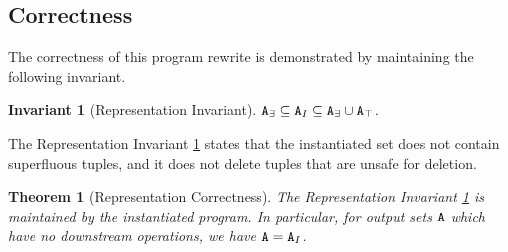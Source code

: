 \documentclass[10pt]{proc}
\numberwithin{equation}{section}
\newtheorem{thm}[theorem]{Theorem}
\newtheorem{invariant}[property]{Invariant}
\renewcommand{\tt}[1]{\ifmmode\text{\texttt{#1}}\else\texttt{#1}\fi}
\begin{document}
\subsection{Correctness}
The correctness of this program rewrite is demonstrated by maintaining the following invariant.
\begin{invariant}[Representation Invariant]\label{inv:representation}
$\tt{A}_\exists \subseteq \tt{A}_I \subseteq \tt{A}_\exists \cup \tt{A}_\top$.
\end{invariant}
The Representation Invariant \ref{inv:representation} states that the instantiated set does not contain superfluous tuples, and it does not delete tuples that are unsafe for deletion.

\begin{thm}[Representation Correctness]
The Representation Invariant \ref{inv:representation} is maintained by the instantiated program.
In particular, for output sets $\tt{A}$ which have no downstream operations, we have $\tt{A} = \tt{A}_I$.
\end{thm}
\end{document}

